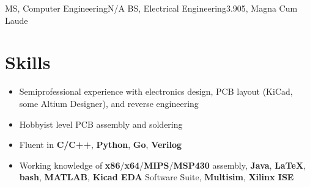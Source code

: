 \documentclass{my_resume}
\begin{document}

    {MS, Computer Engineering}{N/A}
	{BS, Electrical Engineering}{3.905, Magna Cum Laude}

\section{Skills}
\begin{itemize}
    \item Semiprofessional experience with electronics design, PCB layout (KiCad, some Altium Designer), and reverse engineering
    \item Hobbyist level PCB assembly and soldering
    \item Fluent in \textbf{C/C++}, \textbf{Python}, \textbf{Go}, \textbf{Verilog}
    \item Working knowledge of \textbf{x86}/\textbf{x64}/\textbf{MIPS}/\textbf{MSP430} assembly, \textbf{Java}, \textbf{LaTeX}, \textbf{bash}, \textbf{MATLAB}, \textbf{Kicad EDA} Software Suite, \textbf{Multisim}, \textbf{Xilinx ISE}
\end{itemize}
\end{document}
